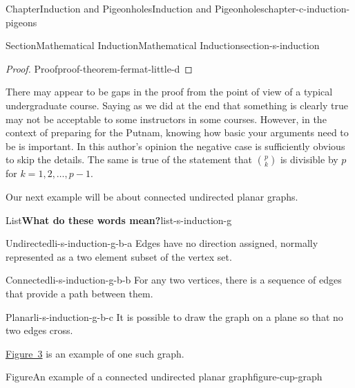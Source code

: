 \documentclass[oneside,10pt,]{book}
\numberwithin{equation}{section}
\begin{document}
\begin{chapterptx}{Chapter}{Induction and Pigeonholes}{}{Induction and Pigeonholes}{}{}{chapter-c-induction-pigeons}
\begin{sectionptx}{Section}{Mathematical Induction}{}{Mathematical Induction}{}{}{section-s-induction}
\begin{proof}{Proof}{}{proof-theorem-fermat-little-d}
\end{proof}
There may appear to be gaps in the proof from the point of view of a typical undergraduate course. Saying as we did at the end that something is clearly true may not be acceptable to some instructors in some courses.  However, in the context of preparing for the Putnam, knowing how basic your arguments need to be is important.  In this author's opinion the negative case is sufficiently obvious to skip the details. The same is true of the statement that \(\binom{p}{k}\) is divisible by \(p\) for \(k = 1, 2,\dots,p-1\).%
\par
Our next example will be about connected undirected planar graphs.%
\begin{listptx}{List}{\textbf{What do these words mean?}}{list-s-induction-g}{}%
%
\begin{descriptionlist}
\begin{dlimedium}{Undirected}{li-s-induction-g-b-a}%
Edges have no direction assigned, normally represented as a two element subset of the vertex set.%
\end{dlimedium}%
\begin{dlimedium}{Connected}{li-s-induction-g-b-b}%
For any two vertices, there is a sequence of edges that provide a path between them.%
\end{dlimedium}%
\begin{dlimedium}{Planar}{li-s-induction-g-b-c}%
It is possible to draw the graph on a plane so that no two edges cross.%
\end{dlimedium}%
\end{descriptionlist}
\end{listptx}%
\hyperref[figure-cup-graph]{Figure~3} is an example of one such graph.%
\begin{figureptx}{Figure}{An example of a connected undirected planar graph}{figure-cup-graph}{}%
\begin{image}{0}{1}{0}%

\end{image}
\end{figureptx}
\end{sectionptx}
\end{chapterptx}
\end{document}
